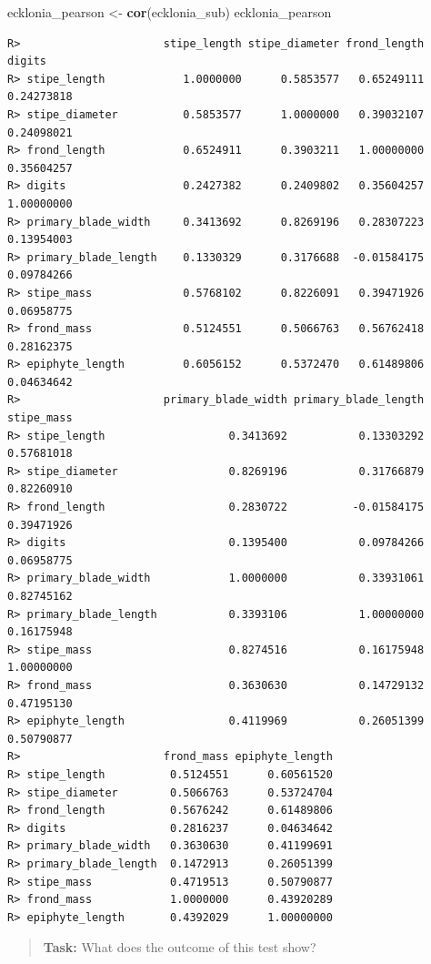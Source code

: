 \documentclass[english,10pt,a4paper,oneside]{book}
\newenvironment{Shaded}{\begin{snugshade}}{\end{snugshade}}
\newcommand{\KeywordTok}[1]{\textcolor[rgb]{0.13,0.29,0.53}{\textbf{#1}}}
\newcommand{\NormalTok}[1]{#1}
\newcommand{\StringTok}[1]{\textcolor[rgb]{0.31,0.60,0.02}{#1}}
\theoremstyle{definition}
\theoremstyle{definition}
\theoremstyle{definition}
\theoremstyle{remark}
\begin{document}
\begin{Shaded}
\begin{Highlighting}[]
\NormalTok{ecklonia_pearson <-}\StringTok{ }\KeywordTok{cor}\NormalTok{(ecklonia_sub)}
\NormalTok{ecklonia_pearson}
\end{Highlighting}
\end{Shaded}

\begin{verbatim}
R>                      stipe_length stipe_diameter frond_length     digits
R> stipe_length            1.0000000      0.5853577   0.65249111 0.24273818
R> stipe_diameter          0.5853577      1.0000000   0.39032107 0.24098021
R> frond_length            0.6524911      0.3903211   1.00000000 0.35604257
R> digits                  0.2427382      0.2409802   0.35604257 1.00000000
R> primary_blade_width     0.3413692      0.8269196   0.28307223 0.13954003
R> primary_blade_length    0.1330329      0.3176688  -0.01584175 0.09784266
R> stipe_mass              0.5768102      0.8226091   0.39471926 0.06958775
R> frond_mass              0.5124551      0.5066763   0.56762418 0.28162375
R> epiphyte_length         0.6056152      0.5372470   0.61489806 0.04634642
R>                      primary_blade_width primary_blade_length stipe_mass
R> stipe_length                   0.3413692           0.13303292 0.57681018
R> stipe_diameter                 0.8269196           0.31766879 0.82260910
R> frond_length                   0.2830722          -0.01584175 0.39471926
R> digits                         0.1395400           0.09784266 0.06958775
R> primary_blade_width            1.0000000           0.33931061 0.82745162
R> primary_blade_length           0.3393106           1.00000000 0.16175948
R> stipe_mass                     0.8274516           0.16175948 1.00000000
R> frond_mass                     0.3630630           0.14729132 0.47195130
R> epiphyte_length                0.4119969           0.26051399 0.50790877
R>                      frond_mass epiphyte_length
R> stipe_length          0.5124551      0.60561520
R> stipe_diameter        0.5066763      0.53724704
R> frond_length          0.5676242      0.61489806
R> digits                0.2816237      0.04634642
R> primary_blade_width   0.3630630      0.41199691
R> primary_blade_length  0.1472913      0.26051399
R> stipe_mass            0.4719513      0.50790877
R> frond_mass            1.0000000      0.43920289
R> epiphyte_length       0.4392029      1.00000000
\end{verbatim}

\begin{quote}
\textbf{Task:} What does the outcome of this test show?
\end{quote}
\end{document}
